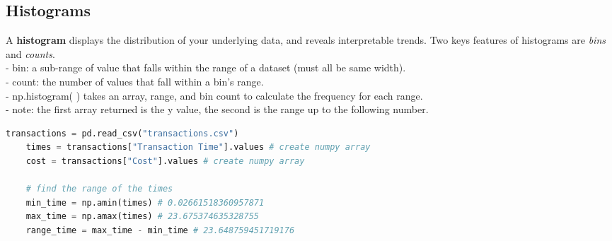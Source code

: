 \documentclass[11pt, a4paper]{article}
\begin{document}
\begin{spacing}{1.1}
	\subsection{Histograms}
	A \textbf{histogram} displays the distribution of your underlying data, and reveals interpretable trends. Two keys features of histograms are \textit{bins} and \textit{counts}. \\
	\hspace*{3mm} - bin: a sub-range of value that falls within the range of a dataset (must all be same width). \\
	\hspace*{3mm} - count: the number of values that fall within a bin's range.	\\
	\hspace*{3mm} - np.histogram( ) takes an array, range, and bin count to calculate the frequency for each range. \\
	\hspace*{7mm} - note: the first array returned is the y value, the second is the range up to the following number.
	\begin{lstlisting}[language=Python]
	transactions = pd.read_csv("transactions.csv")
	times = transactions["Transaction Time"].values # create numpy array
	cost = transactions["Cost"].values # create numpy array
	
	# find the range of the times 
	min_time = np.amin(times) # 0.02661518360957871
	max_time = np.amax(times) # 23.675374635328755
	range_time = max_time - min_time # 23.648759451719176
	

\end{lstlisting}
\end{spacing}
\end{document}

